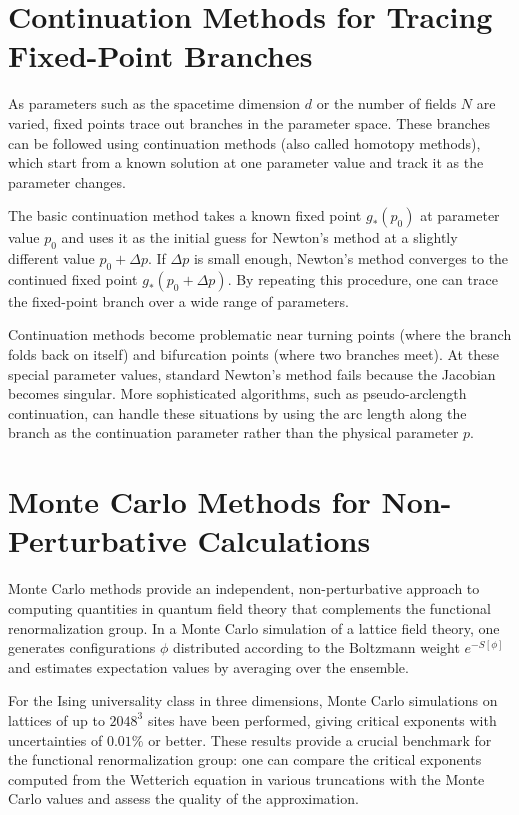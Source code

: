 \documentclass[11pt, twoside, openright]{book}
\theoremstyle{dotted}
\theoremstyle{definition}
\begin{document}
\section{Continuation Methods for Tracing Fixed-Point Branches}

As parameters such as the spacetime dimension $d$ or the number of fields $N$
are varied, fixed points trace out branches in the parameter space. These branches
can be followed using continuation methods (also called homotopy methods), which
start from a known solution at one parameter value and track it as the parameter
changes.

The basic continuation method takes a known fixed point $g_*(p_0)$ at parameter
value $p_0$ and uses it as the initial guess for Newton's method at a slightly
different value $p_0 + \Delta p$. If $\Delta p$ is small enough, Newton's method
converges to the continued fixed point $g_*(p_0 + \Delta p)$. By repeating this
procedure, one can trace the fixed-point branch over a wide range of parameters.

Continuation methods become problematic near turning points (where the branch
folds back on itself) and bifurcation points (where two branches meet). At these
special parameter values, standard Newton's method fails because the Jacobian
becomes singular. More sophisticated algorithms, such as pseudo-arclength
continuation, can handle these situations by using the arc length along the branch
as the continuation parameter rather than the physical parameter $p$.

\section{Monte Carlo Methods for Non-Perturbative Calculations}

Monte Carlo methods provide an independent, non-perturbative approach to computing
quantities in quantum field theory that complements the functional renormalization
group. In a Monte Carlo simulation of a lattice field theory, one generates
configurations $\phi$ distributed according to the Boltzmann weight $e^{-S[\phi]}$
and estimates expectation values by averaging over the ensemble.

For the Ising universality class in three dimensions, Monte Carlo simulations on
lattices of up to $2048^3$ sites have been performed, giving critical exponents
with uncertainties of $0.01\%$ or better. These results provide a crucial benchmark
for the functional renormalization group: one can compare the critical exponents
computed from the Wetterich equation in various truncations with the Monte Carlo
values and assess the quality of the approximation.
\end{document}
